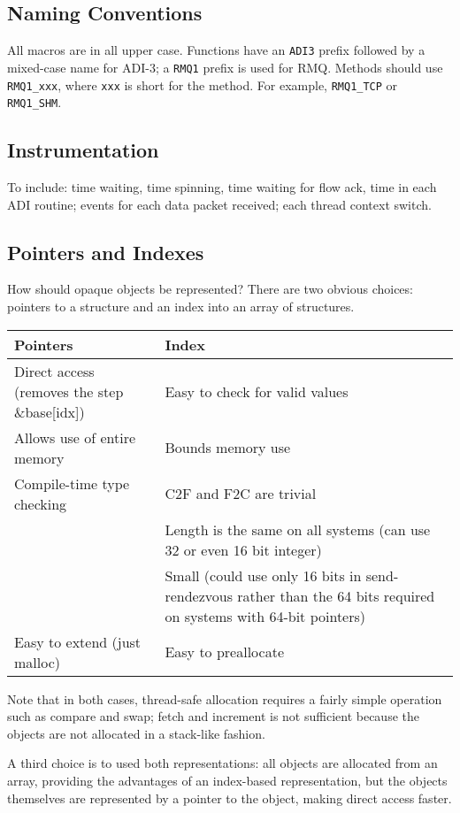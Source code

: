 \documentclass{article}
\let\code=\texttt
\begin{document}
\subsection{Naming Conventions}
All macros are in all upper case.  Functions have an \code{ADI3} prefix
followed by a mixed-case name for ADI-3; a \code{RMQ1} prefix is used for RMQ.
Methods should use \code{RMQ1\_xxx}, where \code{xxx} is short for the method.
For example, \code{RMQ1\_TCP} or \code{RMQ1\_SHM}.

\subsection{Instrumentation}
To include: time waiting, time spinning, time waiting for flow ack, time in
each ADI routine; events for each data packet received; each thread context
switch. 

\subsection{Pointers and Indexes}
How should opaque objects be represented?  There are two obvious choices:
pointers to a structure and an index into an array of structures.  

\begin{center}
\begin{tabular}{p{2.5in}p{2.5in}}
Pointers&Index\\\hline
Direct access (removes the step \&base[idx])&Easy to check for valid values\\
Allows use of entire memory&Bounds memory use\\
Compile-time type checking&C2F and F2C are trivial\\
&Length is the same on all systems (can use 32 or even 16 bit integer)\\
&Small (could use only 16 bits in send-rendezvous rather than the 64 bits
required on systems with 64-bit pointers)\\
Easy to extend (just malloc)&Easy to preallocate\\
\end{tabular}
\end{center}
Note that in both cases, thread-safe allocation requires a fairly simple
operation such as compare and swap; fetch and increment is not sufficient
because the objects are not allocated in a stack-like fashion.

A third choice is to used both representations:  all objects are allocated
from an array, providing the advantages of an index-based representation, but
the objects themselves are represented by a pointer to the object, making
direct access faster.



\end{document}
